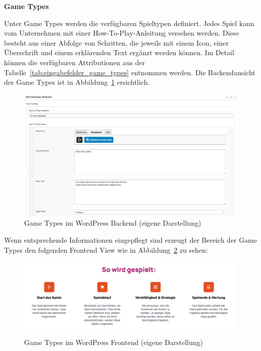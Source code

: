 \newpage
\textbf{Game Types}

Unter Game Types werden die verfügbaren Spieltypen definiert.
Jedes Spiel kann vom Unternehmen mit einer \glqq How-To-Play\grqq{}-Anleitung versehen werden.
Diese besteht aus einer Abfolge von Schritten, die jeweils mit einem Icon, einer Überschrift und einem erklärenden Text ergänzt werden können.
Im Detail können die verfügbaren Attributionen aus der Tabelle~\ref{tab:eingabefelder_game_types} entnommen werden.
Die Backendansicht der Game Types ist in Abbildung~\ref{fig:game-types-settings-legacy} ersichtlich.
\begin{figure}[H]
    \centering
    \includegraphics[width=1\textwidth]{images/legacy_game_types_backend}
    \caption{Game Types im WordPress Backend (eigene Darstellung)}
    \label{fig:game-types-settings-legacy}
\end{figure}
Wenn entsprechende Informationen eingepflegt sind erzeugt der Bereich der Game Types den folgenden Frontend View wie in Abbildung~\ref{fig:game-types-frontend-legacy} zu sehen:
\begin{figure}[H]
    \centering
    \includegraphics[width=1\textwidth]{images/legacy_game_types_frontend}
    \caption{Game Types im WordPress Frontend (eigene Darstellung)}
    \label{fig:game-types-frontend-legacy}
\end{figure}

